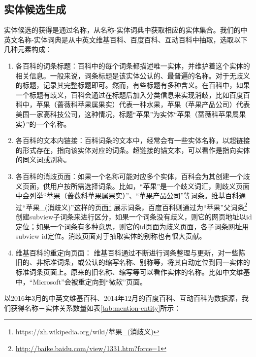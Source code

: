 \subsection{实体候选生成}

实体候选的获得是通过名称，从名称-实体词典中获取相应的实体集合。我们的中英文名称-实体词典是从中英文维基百科、百度百科、互动百科中抽取，选取以下几种元素构成：

\begin{enumerate}[1.]
\item 各百科的词条标题：百科中的每个词条都描述唯一实体，并维护着这个实体的相关信息。一般来说，词条标题是该实体公认的、最普遍的名称。对于无歧义的标题，记录其完整标题即可。然而，有些标题有多种含义。在百科中，如果一个标题有歧义，百科会通过在标题后加入分类信息来实现消歧，比如百度百科中，苹果（蔷薇科苹果属果实）代表一种水果，苹果（苹果产品公司）代表美国一家高科技公司，这种情况，标题“苹果”为实体“苹果（蔷薇科苹果属果实）”的一个名称。
\item 各百科的文本内链接：百科词条的文本中，经常会有一些实体名称，以超链接的形式存在，指向该实体对应的词条。超链接的锚文本，可以看作是指向实体的同义词或别称。
\item 各百科的消歧页面：如果一个名称可能对应多个实体，百科会为其创建一个歧义页面，供用户按所需选择词条。比如，“苹果”是一个歧义词汇，则歧义页面中会列举“苹果（蔷薇科苹果属果实）”、“苹果产品公司”等词条。维基百科通过“苹果\_(消歧义)”这样的页面\footnote{https://zh.wikipedia.org/wiki/苹果\_(消歧义)}
展示词条，百度百科则通过为“苹果”父词条\footnote{\url{http://baike.baidu.com/view/1331.htm?force=1}}创建subview子词条来进行区分，如果一个词条没有歧义，则它的网页地址以id定位；如果一个词条有多种意思，则它的id页面为歧义页面，各子词条网址用subview id定位。消歧页面对于抽取实体的别称也有很大贡献。
\item 维基百科的重定向页面： 维基百科通过不断进行词条整理与更新，对一些陈旧的、非标准词条，或公认的缩写名称、别称等，将其自动定位到同一实体的标准词条页面上。原来的旧名称、缩写等可以看作实体的名称。比如中文维基中，“Microsoft”会被重定向到“微软”页面。
\end{enumerate}

以2016年3月的中英文维基百科、2014年12月的百度百科、互动百科为数据源，我们获得名称－实体关系数量如表\ref{tab:mention-entity}所示：


